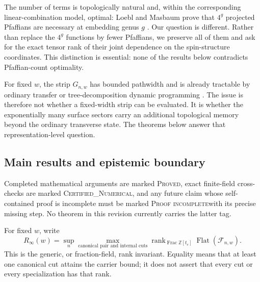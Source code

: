 \documentclass[11pt]{article}
\newcommand{\cF}{\mathcal F}
\newcommand{\rank}{\operatorname{rank}}
\newcommand{\Flat}{\operatorname{Flat}}
\newcommand{\claimtag}[1]{\textsc{#1}}
\newcommand{\proved}{\claimtag{Proved}}
\newcommand{\certified}{\claimtag{Certified\_Numerical}}
\newcommand{\proofpending}{\claimtag{Proof incomplete}}
\begin{document}
The number of terms is topologically natural and, within the corresponding
linear-combination model, optimal: Loebl and Masbaum prove that \(4^g\)
projected Pfaffians are necessary at embedding genus \(g\)
\cite[Theorems~4 and 4.1]{LoeblMasbaum2011}.  Our question is different.
Rather than replace the \(4^g\) functions by fewer Pfaffians, we preserve all
of them and ask for the exact tensor rank of their joint dependence on the
spin-structure coordinates.  This distinction is essential: none of the
results below contradicts Pfaffian-count optimality.

For fixed \(w\), the strip \(G_{n,w}\) has bounded pathwidth and is already
tractable by ordinary transfer or tree-decomposition dynamic programming
\cite{ScottSorkin2009}.  The issue is therefore not whether a fixed-width
strip can be evaluated.  It is whether the exponentially many surface
sectors carry an additional topological memory beyond the ordinary
transverse state.  The theorems below answer that representation-level
question.

\subsection{Main results and epistemic boundary}

Completed mathematical arguments are marked \proved, exact finite-field
cross-checks are marked \certified, and any future claim whose self-contained
proof is incomplete must be marked \proofpending with its precise missing
step.  No theorem in this revision currently carries the latter tag.

For fixed \(w\), write
\begin{equation}\label{eq:Rinf}
 R_\infty(w)=\sup_n\max_{\text{canonical pair and internal cuts}}
       \rank_{\operatorname{Frac}\mathbb Z[t_e]}\Flat(\cF_{n,w}).
\end{equation}
This is the generic, or fraction-field, rank invariant.  Equality means that
at least one canonical cut attains the carrier bound; it does not assert that
every cut or every specialization has that rank.
\end{document}
